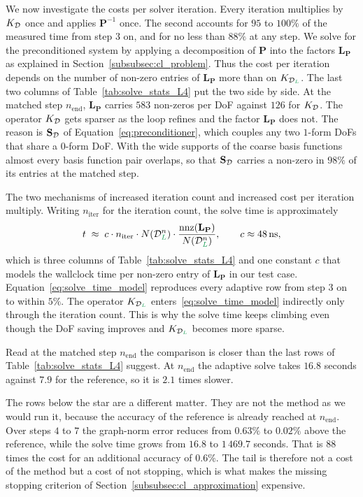\documentclass[a4paper, 12pt]{article}
\makeatletter
\newcommand{\laststep}{{n_{\mathrm{end}}}}                      %
\newcommand{\totalDoFs}[1]{N\!\left(#1\right)}
\newcommand{\green}{\color{ForestGreen}}
\renewcommand{\L}{{\green L}}
\theoremstyle{definition}
\theoremstyle{plain}
\numberwithin{equation}{section}
\DeclareRobustCommand{\domseq}[1][]{\mathcal{D}\ifx\@empty#1\@empty\else_{#1}\fi}
\makeatother
\begin{document}
We now investigate the costs per solver iteration. Every iteration multiplies by $K_{\domseq}$ once and applies $\mathbf{P}^{-1}$ once. The second accounts for $95$ to $100\%$ of the measured time from step $3$ on, and for no less than $88\%$ at any step. We solve for the preconditioned system by applying a decomposition of $\mathbf{P}$ into the factors $\mathbf{L}_{\mathbf{P}}$ as explained in Section~\ref{subsubsec:cl_problem}. Thus the cost per iteration depends on the number of non-zero entries of $\mathbf{L}_{\mathbf{P}}$ more than on $K_{\domseq[\L]}$. The last two columns of Table~\ref{tab:solve_stats_L4} put the two side by side. At the matched step $\laststep$, $\mathbf{L}_{\mathbf{P}}$ carries $583$ non-zeros per DoF against $126$ for $K_{\domseq}$. The operator $K_{\domseq}$ gets sparser as the loop refines and the factor $\mathbf{L}_{\mathbf{P}}$ does not. The reason is $\mathbf{S}_{\domseq}$ of Equation~\eqref{eq:preconditioner}, which couples any two $1$-form DoFs that share a $0$-form DoF. With the wide supports of the coarse basis functions almost every basis function pair overlaps, so that $\mathbf{S}_{\domseq}$ carries a non-zero in $98\%$ of its entries at the matched step.

The two mechanisms of increased iteration count and increased cost per iteration multiply. Writing $n_{\mathrm{iter}}$ for the iteration count, the solve time is approximately
\begin{equation}
    \label{eq:solve_time_model}
    t \; \approx \; c \cdot n_{\mathrm{iter}} \cdot \totalDoFs{\domseq[\L]^n} \cdot \dfrac{\mathrm{nnz}(\mathbf{L}_{\mathbf{P}})}{\totalDoFs{\domseq[\L]^n}}, \qquad c \approx 48\,\mathrm{ns},
\end{equation}
which is three columns of Table~\ref{tab:solve_stats_L4} and one constant $c$ that models the wallclock time per non-zero entry of $\mathbf{L}_{\mathbf{P}}$ in our test case. Equation~\eqref{eq:solve_time_model} reproduces every adaptive row from step $3$ on to within $5\%$. The operator $K_{\domseq[\L]}$ enters~\eqref{eq:solve_time_model} indirectly only through the iteration count. This is why the solve time keeps climbing even though the DoF saving improves and $K_{\domseq[\L]}$ becomes more sparse.

Read at the matched step $\laststep$ the comparison is closer than the last rows of Table~\ref{tab:solve_stats_L4} suggest. At $\laststep$ the adaptive solve takes $16.8$ seconds against $7.9$ for the reference, so it is $2.1$ times slower.

The rows below the star are a different matter. They are not the method as we would run it, because the accuracy of the reference is already reached at $\laststep$. Over steps $4$ to $7$ the graph-norm error reduces from $0.63\%$ to $0.02\%$ above the reference, while the solve time grows from $16.8$ to $1\,469.7$ seconds. That is $88$ times the cost for an additional accuracy of $0.6\%$. The tail is therefore not a cost of the method but a cost of not stopping, which is what makes the missing stopping criterion of Section~\ref{subsubsec:cl_approximation} expensive.
\end{document}
